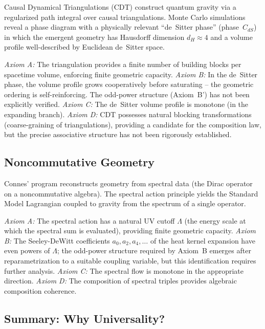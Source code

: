 \documentclass[aps,prd,twocolumn,superscriptaddress,nofootinbib]{revtex4-2}
\begin{document}
Causal Dynamical Triangulations (CDT) \cite{Ambjorn2005,Loll2020} construct quantum gravity via a regularized path integral over causal triangulations. Monte Carlo simulations reveal a phase diagram with a physically relevant ``de~Sitter phase'' (phase~$C_{dS}$) in which the emergent geometry has Hausdorff dimension $d_H \approx 4$ and a volume profile well-described by Euclidean de~Sitter space.

\textit{Axiom A:} The triangulation provides a finite number of building blocks per spacetime volume, enforcing finite geometric capacity. \textit{Axiom B:} In the de~Sitter phase, the volume profile grows cooperatively before saturating -- the geometric ordering is self-reinforcing. The odd-power structure (Axiom~B') has not been explicitly verified. \textit{Axiom C:} The de~Sitter volume profile is monotone (in the expanding branch). \textit{Axiom D:} CDT possesses natural blocking transformations (coarse-graining of triangulations), providing a candidate for the composition law, but the precise associative structure has not been rigorously established.

\subsection{Noncommutative Geometry}

Connes' program \cite{Connes1994} reconstructs geometry from spectral data (the Dirac operator on a noncommutative algebra). The spectral action principle yields the Standard Model Lagrangian coupled to gravity from the spectrum of a single operator.

\textit{Axiom A:} The spectral action has a natural UV cutoff $\Lambda$ (the energy scale at which the spectral sum is evaluated), providing finite geometric capacity. \textit{Axiom B:} The Seeley-DeWitt coefficients $a_0, a_2, a_4, \ldots$ of the heat kernel expansion have even powers of $\Lambda$; the odd-power structure required by Axiom~B emerges after reparametrization to a suitable coupling variable, but this identification requires further analysis. \textit{Axiom C:} The spectral flow is monotone in the appropriate direction. \textit{Axiom D:} The composition of spectral triples provides algebraic composition coherence.

\subsection{Summary: Why Universality?}
\end{document}
